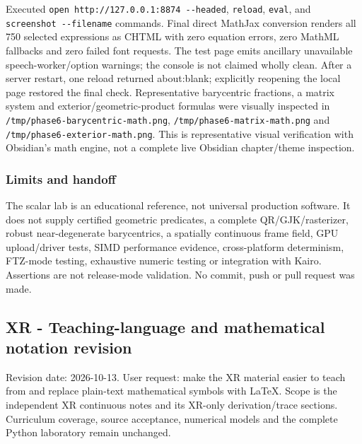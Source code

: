 Executed \texttt{open\ http://127.0.0.1:8874\ -\/-headed}, \texttt{reload}, \texttt{eval}, and \texttt{screenshot\ -\/-filename} commands. Final direct MathJax conversion renders all 750 selected expressions as CHTML with zero equation errors, zero MathML fallbacks and zero failed font requests. The test page emits ancillary unavailable speech-worker/option warnings; the console is not claimed wholly clean. After a server restart, one reload returned about:blank; explicitly reopening the local page restored the final check. Representative barycentric fractions, a matrix system and exterior/geometric-product formulas were visually inspected in \texttt{/tmp/phase6-barycentric-math.png}, \texttt{/tmp/phase6-matrix-math.png} and \texttt{/tmp/phase6-exterior-math.png}. This is representative visual verification with Obsidian's math engine, not a complete live Obsidian chapter/theme inspection.

\subsubsection{Limits and handoff}\label{appendix-a103e7846d21-limits-and-handoff}

\hypertarget{appendix-a103e7846d21-limits-and-handoff}{}

The scalar lab is an educational reference, not universal production software. It does not supply certified geometric predicates, a complete QR/GJK/rasterizer, robust near-degenerate barycentrics, a spatially continuous frame field, GPU upload/driver tests, SIMD performance evidence, cross-platform determinism, FTZ-mode testing, exhaustive numeric testing or integration with Kairo. Assertions are not release-mode validation. No commit, push or pull request was made.

\subsection{XR - Teaching-language and mathematical notation revision}\label{appendix-a103e7846d21-xr---teaching-language-and-mathematical-notation-revision}

\hypertarget{appendix-a103e7846d21-xr---teaching-language-and-mathematical-notation-revision}{}

Revision date: 2026-10-13. User request: make the XR material easier to teach from and replace plain-text mathematical symbols with LaTeX. Scope is the independent XR continuous notes and its XR-only derivation/trace sections. Curriculum coverage, source acceptance, numerical models and the complete Python laboratory remain unchanged.

